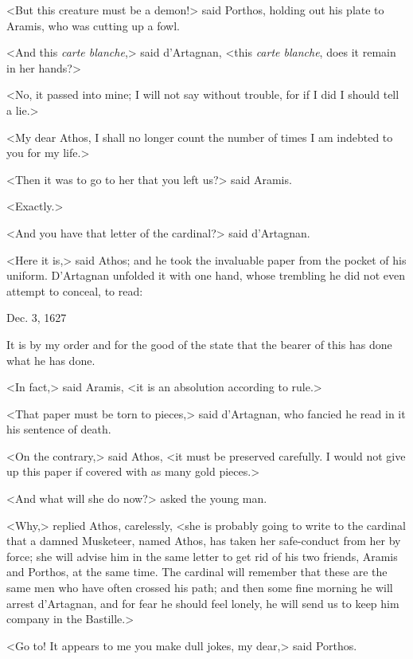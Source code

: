 <But this creature must be a demon!> said Porthos, holding out his plate to Aramis, who was cutting up a fowl. 

<And this \textit{carte blanche},> said d'Artagnan, <this \textit{carte blanche}, does it remain in her hands?> 

<No, it passed into mine; I will not say without trouble, for if I did I should tell a lie.> 

<My dear Athos, I shall no longer count the number of times I am indebted to you for my life.> 

<Then it was to go to her that you left us?> said Aramis. 

<Exactly.> 

<And you have that letter of the cardinal?> said d'Artagnan. 

<Here it is,> said Athos; and he took the invaluable paper from the pocket of his uniform. D'Artagnan unfolded it with one hand, whose trembling he did not even attempt to conceal, to read: 

\begin{mail}{Dec. 3, 1627}

It is by my order and for the good of the state that the bearer of this has done what he has done.

\end{mail}

<In fact,> said Aramis, <it is an absolution according to rule.> 

<That paper must be torn to pieces,> said d'Artagnan, who fancied he read in it his sentence of death. 

<On the contrary,> said Athos, <it must be preserved carefully. I would not give up this paper if covered with as many gold pieces.> 

<And what will she do now?> asked the young man. 

<Why,> replied Athos, carelessly, <she is probably going to write to the cardinal that a damned Musketeer, named Athos, has taken her safe-conduct from her by force; she will advise him in the same letter to get rid of his two friends, Aramis and Porthos, at the same time. The cardinal will remember that these are the same men who have often crossed his path; and then some fine morning he will arrest d'Artagnan, and for fear he should feel lonely, he will send us to keep him company in the Bastille.> 

<Go to! It appears to me you make dull jokes, my dear,> said Porthos. 

